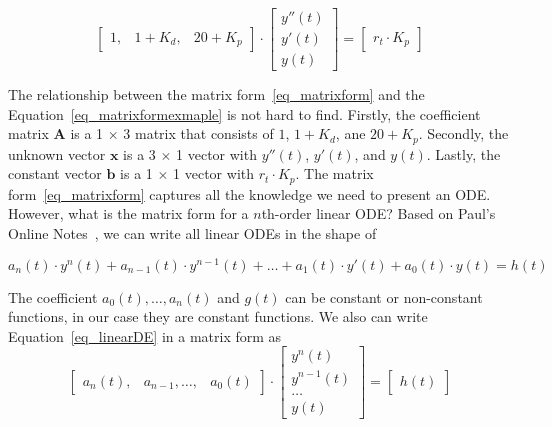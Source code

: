 \begin{equation} \label{eq_matrixformexmaple}
	\begin{bmatrix}
		1, & 1 + K_{d}, & 20 + K_{p}
	\end{bmatrix}
	\cdot
	\begin{bmatrix}
		y''(t)  \\
		y'(t)   \\
		y(t)  
	\end{bmatrix}
	=
	\begin{bmatrix}
		r_{t} \cdot K_{p} 
	\end{bmatrix}
\end{equation}

The relationship between the matrix form~\ref{eq_matrixform} and the Equation~\ref{eq_matrixformexmaple} is not hard to find. Firstly, the coefficient matrix $\boldsymbol{A}$ is a 1 $\times$ 3 matrix that consists of $1$, $1 + K_d$, ane $20 + K_p$. Secondly, the unknown vector $\boldsymbol{x}$ is a 3 $\times$ 1 vector with $y''(t)$, $y'(t)$, and $y(t)$. Lastly, the constant vector $\boldsymbol{b}$ is a 1 $\times$ 1 vector with $r_t \cdot K_p$. The matrix form~\ref{eq_matrixform} captures all the knowledge we need to present an ODE. However, what is the matrix form for a $n$th-order linear ODE? Based on Paul's Online Notes~\citep{paullinearode}, we can write all linear ODEs in the shape of

\begin{equation} \label{eq_linearDE}
	a_n(t) \cdot y^n(t) + a_{n-1}(t) \cdot y^{n-1}(t) + \dots + a_1(t) \cdot y'(t) + a_0(t) \cdot y(t) = h(t)
\end{equation}

The coefficient $a_0(t), \dots, a_n(t)$ and $g(t)$ can be constant or non-constant functions, in our case they are constant functions. We also can write Equation~\ref{eq_linearDE} in a matrix form as
\begin{equation} \label{eq_matrixnthorder}
	\begin{bmatrix}
		a_n(t), & a_{n-1}, \dots, & a_0(t)
	\end{bmatrix}
	\cdot
	\begin{bmatrix}
		y^{n}(t) \\
		y^{n-1}(t) \\
		\dots \\
		y(t)  
	\end{bmatrix}
	=
	\begin{bmatrix}
		h(t)
	\end{bmatrix}
\end{equation}


